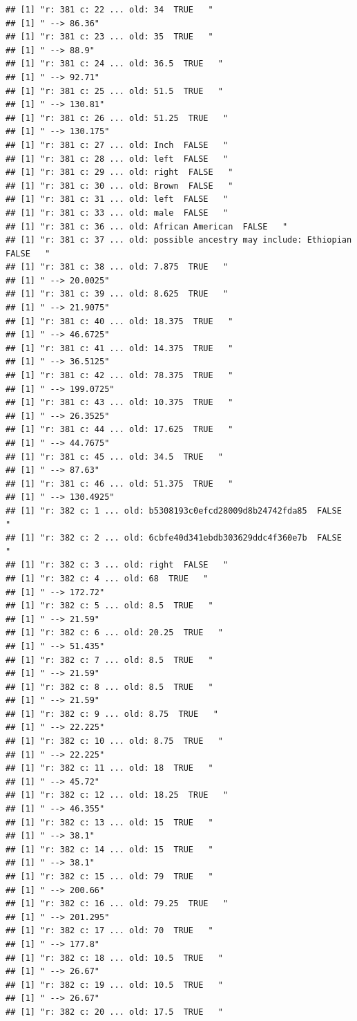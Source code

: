 \documentclass[]{article}
\begin{document}
\begin{verbatim}
## [1] "r: 381 c: 22 ... old: 34  TRUE   "
## [1] " --> 86.36"
## [1] "r: 381 c: 23 ... old: 35  TRUE   "
## [1] " --> 88.9"
## [1] "r: 381 c: 24 ... old: 36.5  TRUE   "
## [1] " --> 92.71"
## [1] "r: 381 c: 25 ... old: 51.5  TRUE   "
## [1] " --> 130.81"
## [1] "r: 381 c: 26 ... old: 51.25  TRUE   "
## [1] " --> 130.175"
## [1] "r: 381 c: 27 ... old: Inch  FALSE   "
## [1] "r: 381 c: 28 ... old: left  FALSE   "
## [1] "r: 381 c: 29 ... old: right  FALSE   "
## [1] "r: 381 c: 30 ... old: Brown  FALSE   "
## [1] "r: 381 c: 31 ... old: left  FALSE   "
## [1] "r: 381 c: 33 ... old: male  FALSE   "
## [1] "r: 381 c: 36 ... old: African American  FALSE   "
## [1] "r: 381 c: 37 ... old: possible ancestry may include: Ethiopian  FALSE   "
## [1] "r: 381 c: 38 ... old: 7.875  TRUE   "
## [1] " --> 20.0025"
## [1] "r: 381 c: 39 ... old: 8.625  TRUE   "
## [1] " --> 21.9075"
## [1] "r: 381 c: 40 ... old: 18.375  TRUE   "
## [1] " --> 46.6725"
## [1] "r: 381 c: 41 ... old: 14.375  TRUE   "
## [1] " --> 36.5125"
## [1] "r: 381 c: 42 ... old: 78.375  TRUE   "
## [1] " --> 199.0725"
## [1] "r: 381 c: 43 ... old: 10.375  TRUE   "
## [1] " --> 26.3525"
## [1] "r: 381 c: 44 ... old: 17.625  TRUE   "
## [1] " --> 44.7675"
## [1] "r: 381 c: 45 ... old: 34.5  TRUE   "
## [1] " --> 87.63"
## [1] "r: 381 c: 46 ... old: 51.375  TRUE   "
## [1] " --> 130.4925"
## [1] "r: 382 c: 1 ... old: b5308193c0efcd28009d8b24742fda85  FALSE   "
## [1] "r: 382 c: 2 ... old: 6cbfe40d341ebdb303629ddc4f360e7b  FALSE   "
## [1] "r: 382 c: 3 ... old: right  FALSE   "
## [1] "r: 382 c: 4 ... old: 68  TRUE   "
## [1] " --> 172.72"
## [1] "r: 382 c: 5 ... old: 8.5  TRUE   "
## [1] " --> 21.59"
## [1] "r: 382 c: 6 ... old: 20.25  TRUE   "
## [1] " --> 51.435"
## [1] "r: 382 c: 7 ... old: 8.5  TRUE   "
## [1] " --> 21.59"
## [1] "r: 382 c: 8 ... old: 8.5  TRUE   "
## [1] " --> 21.59"
## [1] "r: 382 c: 9 ... old: 8.75  TRUE   "
## [1] " --> 22.225"
## [1] "r: 382 c: 10 ... old: 8.75  TRUE   "
## [1] " --> 22.225"
## [1] "r: 382 c: 11 ... old: 18  TRUE   "
## [1] " --> 45.72"
## [1] "r: 382 c: 12 ... old: 18.25  TRUE   "
## [1] " --> 46.355"
## [1] "r: 382 c: 13 ... old: 15  TRUE   "
## [1] " --> 38.1"
## [1] "r: 382 c: 14 ... old: 15  TRUE   "
## [1] " --> 38.1"
## [1] "r: 382 c: 15 ... old: 79  TRUE   "
## [1] " --> 200.66"
## [1] "r: 382 c: 16 ... old: 79.25  TRUE   "
## [1] " --> 201.295"
## [1] "r: 382 c: 17 ... old: 70  TRUE   "
## [1] " --> 177.8"
## [1] "r: 382 c: 18 ... old: 10.5  TRUE   "
## [1] " --> 26.67"
## [1] "r: 382 c: 19 ... old: 10.5  TRUE   "
## [1] " --> 26.67"
## [1] "r: 382 c: 20 ... old: 17.5  TRUE   "

\end{verbatim}
\end{document}
